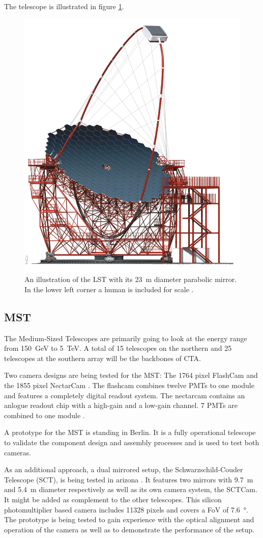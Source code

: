 The telescope is illustrated in figure \ref{fig:lst}.

\begin{figure}
		\centering
		\captionsetup{width=0.9\linewidth}
		\includegraphics[width=.5\textwidth]{images/LST.png}
		\caption{
			An illustration of the LST with its
			\SI{23}{\meter} diameter parabolic mirror.
			In the lower left corner a human is included for scale \cite{cta_web}.}
		\label{fig:lst}
\end{figure}

\subsection{MST}
The Medium-Sized Telescopes are primarily going to look at the 
energy range from \SI{150}{\giga\electronvolt} to \SI{5}{\tera\electronvolt}.
A total of 15 telescopes on the northern and 25 telescopes at the southern array
will be the backbones of CTA.

Two camera designs are being tested for the MST:
The 1764 pixel FlashCam and the 1855 pixel NectarCam \cite{cta_web}.
The flashcam combines twelve PMTs to one module and features a completely
digital readout system.
The nectarcam contains an anlogue readout chip with a high-gain and a low-gain
channel. 7 PMTs are combined to one module \cite{doi:10.1063/1.4969023}.

A prototype for the MST is standing in Berlin.
It is a fully operational telescope
to validate the component design and assembly processes and is used to test
both cameras.

As an additional approach, a dual mirrored setup, the Schwarzschild-Couder Telescope (SCT), is being tested in arizona \cite{cta_web}.
It features two mirrors with \SI{9.7}{\meter} and \SI{5.4}{\meter} diameter respectively
as well as its own camera system, the SCTCam.
It might be added as complement to the other telescopes.
This silicon photomultiplier based camera includes 11328 pixels and covers a FoV of
\SI{7.6}{\degree}.
The prototype is being tested to gain experience with the optical alignment and operation of
the camera as well as to demonstrate the performance of the setup.

